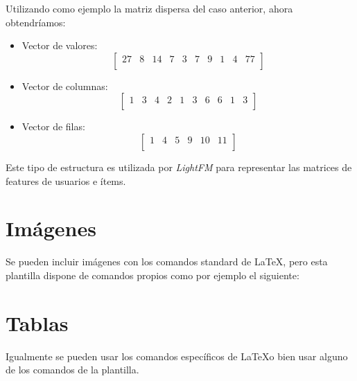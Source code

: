Utilizando como ejemplo la matriz dispersa del caso anterior, ahora obtendríamos:
\begin{itemize}
\tightlist
\item Vector de valores: \[\begin{bmatrix} 27&8&14&7&3&7&9&1&4&77\\\end{bmatrix}\]
\item Vector de columnas: \[\begin{bmatrix} 1&3&4&2&1&3&6&6&1&3\\
\end{bmatrix}\]
\item Vector de filas: \[\begin{bmatrix} 1&4&5&9&10&11\\\end{bmatrix}\]
\end{itemize}

Este tipo de estructura es utilizada por \textit{LightFM} para representar las matrices de features de usuarios e ítems.

\section{Imágenes}

Se pueden incluir imágenes con los comandos standard de \LaTeX, pero esta plantilla dispone de comandos propios como por ejemplo el siguiente:


\section{Tablas}

Igualmente se pueden usar los comandos específicos de \LaTeX o bien usar alguno de los comandos de la plantilla.

